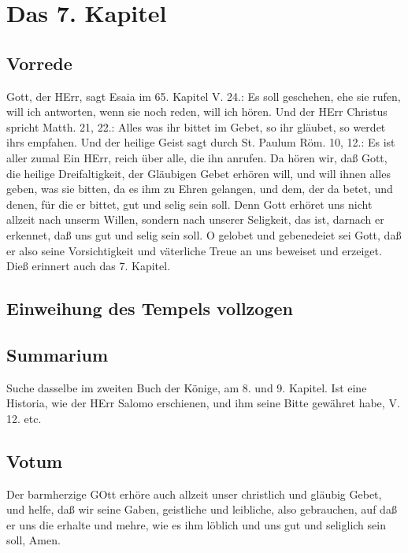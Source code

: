 \chapter{Das 7. Kapitel}

\section{Vorrede}

Gott, der HErr, sagt Esaia im 65. Kapitel V. 24.: Es soll geschehen, ehe sie rufen, will ich antworten, wenn sie noch reden, will ich hören. Und der HErr Christus spricht Matth. 21, 22.: Alles was ihr bittet im Gebet, so ihr gläubet, so werdet ihrs empfahen. Und der heilige Geist sagt durch St. Paulum Röm. 10, 12.: Es ist aller zumal Ein HErr, reich über alle, die ihn anrufen. Da hören wir, daß Gott, die heilige Dreifaltigkeit, der Gläubigen Gebet erhören will, und will ihnen alles geben, was sie bitten, da es ihm zu Ehren gelangen, und dem, der da betet, und denen, für die er bittet, gut und selig sein soll. Denn Gott erhöret uns nicht allzeit nach unserm Willen, sondern nach unserer Seligkeit, das ist, darnach er erkennet, daß uns gut und selig sein soll. O gelobet und gebenedeiet sei Gott, daß er also seine Vorsichtigkeit und väterliche Treue an uns beweiset und erzeiget. Dieß erinnert auch das 7. Kapitel.

\section[Einweihung des Tempels vollzogen]{Einweihung des Tempels vollzogen}

\section{Summarium}

Suche dasselbe im zweiten Buch der Könige, am 8. und 9. Kapitel. Ist eine Historia, wie der HErr Salomo erschienen, und ihm seine Bitte gewähret habe, V. 12. etc.

\section{Votum}

Der barmherzige GOtt erhöre auch allzeit unser christlich und gläubig Gebet, und helfe, daß wir seine Gaben, geistliche und leibliche, also gebrauchen, auf daß er uns die erhalte und mehre, wie es ihm löblich und uns gut und seliglich sein soll, Amen.

